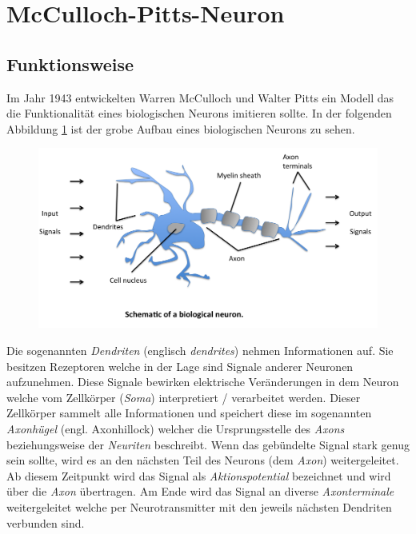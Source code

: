 \section{McCulloch-Pitts-Neuron} \label{sc:mpn}

\subsection{Funktionsweise}

Im Jahr 1943 entwickelten Warren McCulloch und Walter Pitts ein Modell das die Funktionalität eines biologischen Neurons imitieren sollte. In der folgenden Abbildung \ref{fig:bioNeuron} ist der grobe Aufbau eines biologischen Neurons zu sehen. 

\begin{figure}[!htb]
	\centering
	\includegraphics[width=\linewidth]{img/bioNeuron}
	\label{fig:bioNeuron}
\end{figure}

Die sogenannten \emph{Dendriten} (englisch \emph{dendrites}) nehmen Informationen auf. Sie besitzen Rezeptoren welche in der Lage sind Signale anderer Neuronen aufzunehmen. Diese Signale bewirken elektrische Veränderungen in dem Neuron welche vom Zellkörper (\emph{Soma}) interpretiert / verarbeitet werden. Dieser Zellkörper sammelt alle Informationen und speichert diese im sogenannten \emph{Axonhügel} (engl. Axonhillock) welcher die Ursprungsstelle des \emph{Axons} beziehungsweise der \emph{Neuriten} beschreibt. Wenn das gebündelte Signal stark genug sein sollte, wird es an den nächsten Teil des Neurons (dem \emph{Axon}) weitergeleitet. Ab diesem Zeitpunkt wird das Signal als \emph{Aktionspotential} bezeichnet und wird über die \emph{Axon} übertragen. Am Ende wird das Signal an diverse \emph{Axonterminale} weitergeleitet welche per Neurotransmitter mit den jeweils nächsten Dendriten verbunden sind. 

